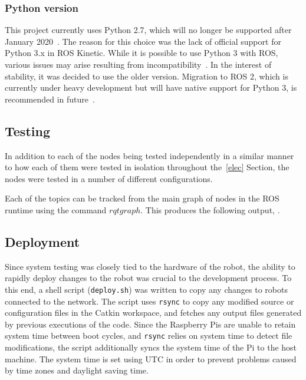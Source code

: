 \subsubsection{Python version}
This project currently uses Python 2.7, which will no longer be supported after January 2020~\cite{python2-eol}. The reason for this choice was the lack of official support for Python 3.x in ROS Kinetic. While it is possible to use Python 3 with ROS, various issues may arise resulting from incompatibility~\cite{medium-ros-python3}. In the interest of stability, it was decided to use the older version. Migration to ROS 2, which is currently under heavy development but will have native support for Python 3, is recommended in future~\cite{ros2}.






\subsection{Testing}\label{soft/ROS/test}
In addition to each of the nodes being tested independently in a similar manner to how each of them were tested in isolation throughout the~\ref{elec} Section, the nodes were tested in a number of different configurations.

Each of the topics can be tracked from the main graph of nodes in the ROS runtime using the command $rqt graph$. This produces the following output, .


\subsection{Deployment}\label{soft/ROS/deploy}
Since system testing was closely tied to the hardware of the robot, the ability to rapidly deploy changes to the robot was crucial to the development process. To this end, a shell script (\verb|deploy.sh|) was written to copy any changes to robots connected to the network. The script uses \verb|rsync| to copy any modified source or configuration files in the Catkin workspace, and fetches any output files generated by previous executions of the code. Since the Raspberry Pis are unable to retain system time between boot cycles, and \verb|rsync| relies on system time to detect file modifications, the script additionally syncs the system time of the Pi to the host machine. The system time is set using UTC in order to prevent problems caused by time zones and daylight saving time.

